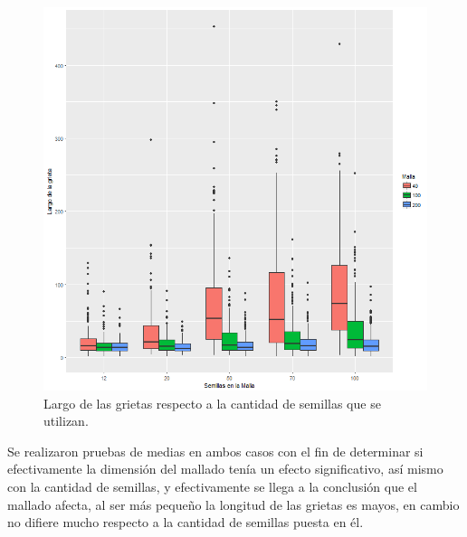 \documentclass[a4paper]{article}
\begin{document}
\begin{figure}[h]
\centering
\includegraphics[width=0.7\linewidth]{DistanciasS}
\caption{Largo de las grietas respecto a la cantidad de semillas que se utilizan.}
\label{fig:DistanciasS}
\end{figure}

Se realizaron pruebas de medias en ambos casos con el fin de determinar si efectivamente la dimensión del mallado tenía un efecto significativo, así mismo con la cantidad de semillas, y efectivamente se llega a la conclusión que el mallado afecta, al ser más pequeño la longitud de las grietas es mayos, en cambio no difiere mucho respecto a la cantidad de semillas puesta en él.
\end{document}
